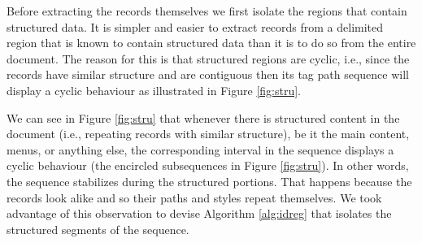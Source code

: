 \documentclass{vldb}
\begin{document}
Before extracting the records themselves we first isolate the regions that
contain structured data. It is simpler and easier to extract records from a
delimited region that is known to contain structured data than it is to do so
from the entire document. The reason for this is that structured regions are
cyclic, i.e., since the records have similar structure and are contiguous then
its tag path sequence will display a cyclic behaviour as illustrated in Figure
\ref{fig:stru}.

We can see in Figure \ref{fig:stru} that whenever there is structured
content in the document (i.e., repeating records with similar structure), be it
the main content, menus, or anything else, the corresponding interval in the
sequence displays a cyclic behaviour (the encircled subsequences in Figure
\ref{fig:stru}).
In other words, the sequence stabilizes during the structured portions. That
happens because the records look alike and so their paths and styles repeat
themselves. We took advantage of this observation to devise Algorithm
\ref{alg:idreg} that isolates the structured segments of the sequence.
\end{document}
